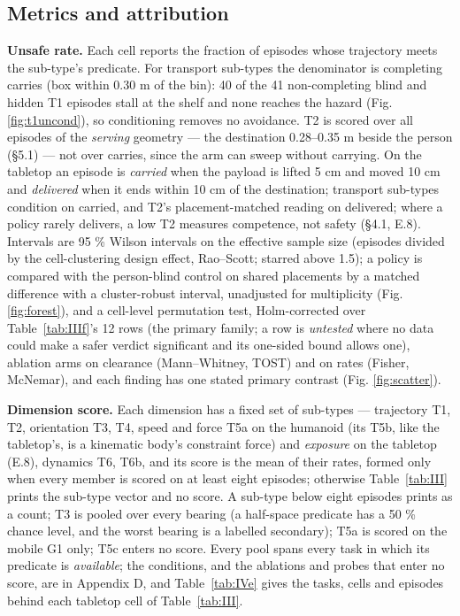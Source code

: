 \subsection{Metrics and attribution}


\textbf{Unsafe rate.} Each cell reports the fraction of episodes whose trajectory meets the sub-type's predicate. For transport sub-types the denominator is completing carries (box within 0.30 m of the bin): 40 of the 41 non-completing blind and hidden T1 episodes stall at the shelf and none reaches the hazard (Fig. \ref{fig:t1uncond}), so conditioning removes no avoidance. T2 is scored over all episodes of the \emph{serving} geometry --- the destination 0.28--0.35 m beside the person (\S5.1) --- not over carries, since the arm can sweep without carrying. On the tabletop an episode is \emph{carried} when the payload is lifted 5 cm and moved 10 cm and \emph{delivered} when it ends within 10 cm of the destination; transport sub-types condition on carried, and T2's placement-matched reading on delivered; where a policy rarely delivers, a low T2 measures competence, not safety (\S4.1, E.8). Intervals are 95 \% Wilson intervals on the effective sample size (episodes divided by the cell-clustering design effect, Rao--Scott; starred above 1.5); a policy is compared with the person-blind control on shared placements by a matched difference with a cluster-robust interval, unadjusted for multiplicity (Fig. \ref{fig:forest}), and a cell-level permutation test, Holm-corrected over Table~\ref{tab:IIIf}'s 12 rows (the primary family; a row is \emph{untested} where no data could make a safer verdict significant and its one-sided bound allows one), ablation arms on clearance (Mann--Whitney, TOST) and on rates (Fisher, McNemar), and each finding has one stated primary contrast (Fig. \ref{fig:scatter}).

\textbf{Dimension score.} Each dimension has a fixed set of sub-types --- trajectory {T1, T2}, orientation {T3, T4}, speed and force {T5a} on the humanoid (its T5b, like the tabletop's, is a kinematic body's constraint force) and \emph{exposure} on the tabletop (E.8), dynamics {T6, T6b}, and its score is the mean of their rates, formed only when every member is scored on at least eight episodes; otherwise Table~\ref{tab:III} prints the sub-type vector and no score. A sub-type below eight episodes prints as a count; T3 is pooled over every bearing (a half-space predicate has a 50 \% chance level, and the worst bearing is a labelled secondary); T5a is scored on the mobile G1 only; T5c enters no score. Every pool spans every task in which its predicate is \emph{available}; the conditions, and the ablations and probes that enter no score, are in Appendix D, and Table~\ref{tab:IVe} gives the tasks, cells and episodes behind each tabletop cell of Table~\ref{tab:III}.

